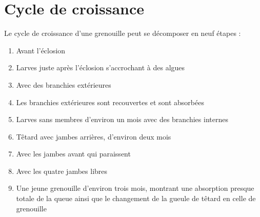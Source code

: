 \documentclass[10pt,a4paper]{article}
\begin{document}
\section{Cycle de croissance}
 
  Le cycle de croissance d'une grenouille peut se décomposer en neuf étapes :
    \begin{enumerate}[label=\arabic*.]
    \item Avant l'éclosion
    \item Larves juste après l'éclosion s'accrochant à des algues
    \item Avec des branchies extérieures
    \item Les branchies extérieures sont recouvertes et sont absorbées
    \item Larves sans membres d'environ un mois avec des branchies internes
    \item Têtard avec jambes arrières, d'environ deux mois
    \item Avec les jambes avant qui paraissent
    \item Avec les quatre jambes libres
    \item Une jeune grenouille d'environ trois mois, montrant une absorption presque totale de la queue ainsi que le changement de la gueule de têtard en celle de grenouille
    
    
    \end{enumerate}
\end{document}
